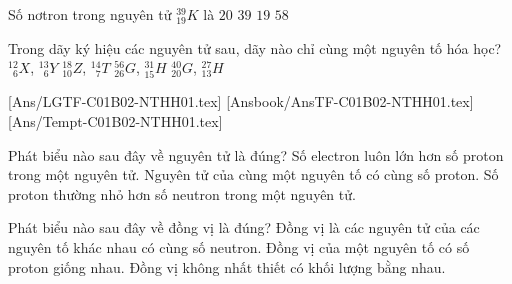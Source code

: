 \begin{ex}
	Số nơtron trong nguyên tử ${}^{39}_{19}K$ là
	\choice
	{\True$20$}
	{$39$}
	{$19$}
	{$58$}
\end{ex}
\begin{ex}
	Trong dãy ký hiệu các nguyên tử sau, dãy nào chỉ cùng một nguyên tố hóa học?
	\choice
	{\True ${}^{12}_{\phantom{0}6}X$, ${}^{13}_{\phantom{0}6}Y$}
	{${}^{18}_{10}Z$, ${}^{14}_{\phantom{0}7}T$}
	{${}^{56}_{26}G$, ${}^{31}_{15}H$}
	{${}^{40}_{20}G$, ${}^{27}_{13}H$}
\end{ex}

[Ans/LGTF-C01B02-NTHH01.tex]
[Ansbook/AnsTF-C01B02-NTHH01.tex]
[Ans/Tempt-C01B02-NTHH01.tex]
\begin{ex}%
	Phát biểu nào sau đây về nguyên tử là đúng?
	{Số electron luôn lớn hơn số proton trong một nguyên tử.}
	{\True Nguyên tử của cùng một nguyên tố có cùng số proton.}
	{\True Số proton thường nhỏ hơn số neutron trong một nguyên tử.}
\end{ex}

\begin{ex}%
	Phát biểu nào sau đây về đồng vị là đúng?
	{Đồng vị là các nguyên tử của các nguyên tố khác nhau có cùng số neutron.}
	{\True Đồng vị của một nguyên tố có số proton giống nhau.}
	{\True Đồng vị không nhất thiết có khối lượng bằng nhau.}
\end{ex}

